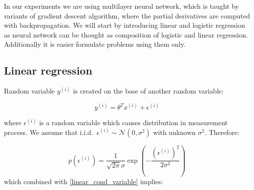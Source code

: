 In our experiments we are using multilayer neural network, which is taught by variants of gradient descent algorithm, where the partial derivatives are computed with backpropagation. We will start by introducing linear and logistic regression as neural network can be thought as composition of logistic and linear regression. Additionally it is easier formulate problems using them only.

\begin{comment}
\subsection{Perceptron}
Perceptron can be defined as a step function on dot product $z = \theta^T x$:
\[
 g(z) =
  \begin{cases} 
      0 \hfill & z < 0 \\
      1 \hfill & z \geq 0 \\
  \end{cases}
\]

If we put $h_\theta(x)=g(\theta^Tx)$ as our hypothesis then we can define perceptron learning rule as:

\begin{equation}
	\theta \equiv \theta + \alpha(y^{(i)}-h_\theta(x^{(i)}))x^{(i)} 
\end{equation}

However perceptron is very difficult to handle in terms of probability or maximum likelihood estimator (\textcite{ng_cs229_2000}). We will focus more on linear and especially on logistic regression: 

\end{comment}

\subsection{Linear regression}
Random variable $y^{(i)}$ is created on the base of another random variable:

\begin{equation}
	y^{(i)}=\theta^Tx^{(i)} + \epsilon^{(i)}
	\label{linear_cond_variable}
\end{equation}

\newcommand\iid{i.i.d.}
\newcommand\pN{\mathcal{N}}
where $\epsilon^{(i)}$ is a random variable which causes distribution in measurement process. We assume that \iid~$\epsilon^{(i)} \sim \pN(0, \sigma^2)$ with unknown $\sigma^2$. Therefore:

\begin{equation}
	p(\epsilon^{(i)}) = \frac {1}{\sqrt{2\pi}\sigma}\exp\left(- \frac{(\epsilon^{(i)})^2}{2\sigma^2} \right) 
\end{equation}
which combined with \eqref{linear_cond_variable} implies:

